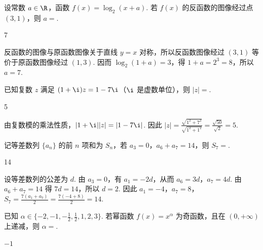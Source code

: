 \begin{problem}
设常数 \(a\in\R\)，函数 \(f(x)=\log_2(x+a)\). 若 \(f(x)\) 的反函数的图像经过点 \((3,1)\)，则 \(a=\)\fillinblank{}.
\end{problem}

\begin{answer}
7
\end{answer}

\begin{solution}
反函数的图像与原函数图像关于直线 \(y=x\) 对称，所以反函数图像经过 \((3,1)\) 等价于原函数图像经过 \((1,3)\). 因而 \(\log_2(1+a)=3\)，得 \(1+a=2^3=8\)，所以 \(a=7\).
\end{solution}

\begin{problem}
已知复数 \(z\) 满足 \((1+\i)z=1-7\i\)（\(\i\) 是虚数单位），则 \(\lvert z\rvert=\)\fillinblank{}.
\end{problem}

\begin{answer}
5
\end{answer}

\begin{solution}
由复数模的乘法性质，\(\lvert1+\i\rvert\lvert z\rvert=\lvert1-7\i\rvert\). 因此 \(\lvert z\rvert=\frac{\sqrt{1^2+7^2}}{\sqrt{1^2+1^2}}=\frac{\sqrt{50}}{\sqrt2}=5\).
\end{solution}

\begin{problem}
记等差数列 \(\{a_n\}\) 的前 \(n\) 项和为 \(S_n\)，若 \(a_3=0\)，\(a_6+a_7=14\)，则 \(S_7=\)\fillinblank{}.
\end{problem}

\begin{answer}
14
\end{answer}

\begin{solution}
设等差数列的公差为 \(d\). 由 \(a_3=0\)，有 \(a_1=-2d\)，从而 \(a_6=3d\)，\(a_7=4d\). 由 \(a_6+a_7=14\) 得 \(7d=14\)，所以 \(d=2\). 因此 \(a_1=-4\)，\(a_7=8\)，\(S_7=\frac{7(a_1+a_7)}2=\frac{7(-4+8)}2=14\).
\end{solution}

\begin{problem}
已知 \(\alpha\in\{-2,-1,-\frac12,\frac12,1,2,3\}\). 若幂函数 \(f(x)=x^\alpha\) 为奇函数，且在 \((0,+\infty)\) 上递减，则 \(\alpha=\)\fillinblank{}.
\end{problem}

\begin{answer}
\(-1\)
\end{answer}

